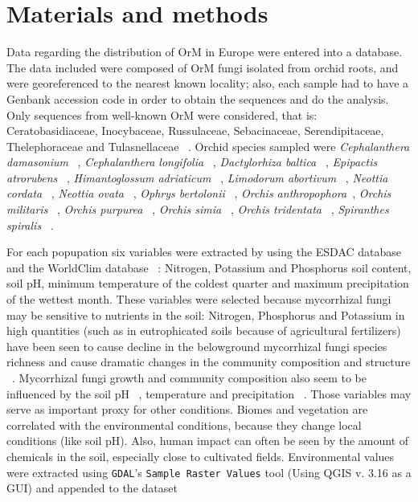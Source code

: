 \part{Materials and methods}
\label{materialsandmethods}

Data regarding the distribution of OrM in Europe were entered into a database. The data included were composed of OrM fungi isolated from orchid roots, and were georeferenced to the nearest known locality; also, each sample had to have a Genbank accession code in order to obtain the sequences and do the analysis.
Only sequences from well-known OrM were considered, that is: Ceratobasidiaceae, Inocybaceae, Russulaceae, Sebacinaceae, Serendipitaceae, Thelephoraceae and Tulasnellaceae ~\citep{dearnaley2012}.
Orchid species sampled were \emph{Cephalanthera damasonium} ~\citep{julou2005}, \emph{Cephalanthera longifolia} ~\citep{pecoraro2017}, \emph{Dactylorhiza baltica} ~\citep{shefferson2008}, \emph{Epipactis atrorubens} ~\citep{shefferson2008}, \emph{Himantoglossum adriaticum} ~\citep{pecoraro2013}, \emph{Limodorum abortivum} ~\citep{girlanda2005}, \emph{Neottia cordata} ~\citep{tesitelova2015}, \emph{Neottia ovata} ~\citep{hansjacquemyn2015, tesitelova2015}, \emph{Ophrys bertolonii} ~\citep{pecoraro2015}, \emph{Orchis anthropophora}~\citep{julou2005}, \emph{Orchis militaris} ~\citep{shefferson2008}, \emph{Orchis purpurea} ~\citep{lievens2010}, \emph{Orchis simia} ~\citep{schatz2010, lievens2010}, \emph{Orchis tridentata} ~\citep{pecoraro2012}, \emph{Spiranthes spiralis} ~\citep{duffy2019}.

For each popupation six variables were extracted by using the ESDAC database ~\citep{panagos2012} and the WorldClim database ~\citep{hijmans2005}: Nitrogen, Potassium and Phosphorus soil content, soil pH, minimum temperature of the coldest quarter and maximum precipitation of the wettest month. These variables were selected because mycorrhizal fungi may be sensitive to nutrients in the soil: Nitrogen, Phosphorus and Potassium in high quantities (such as in eutrophicated soils because of agricultural fertilizers) have been seen to cause decline in the belowground mycorrhizal fungi species richness and cause dramatic changes in the community composition and structure ~\citep{lilleskov2002, baar2002, grant2011}. Mycorrhizal fungi growth and community composition also seem to be influenced by the soil pH ~\citep{aarle2002, carrino-kyker2016}, temperature and precipitation ~\citep{rillig2003}. Those variables may serve as important proxy for other conditions. Biomes and vegetation are correlated with the environmental conditions, because they change local conditions (like soil pH). Also, human impact can often be seen by the amount of chemicals in the soil, especially close to cultivated fields.
Environmental values were extracted using \texttt{GDAL}'s \texttt{Sample Raster Values} tool (Using QGIS v. 3.16 as a GUI) and appended to the dataset

